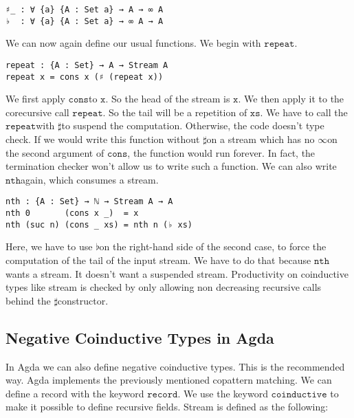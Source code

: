 \documentclass[a4paper,cleardoubleempty,BCOR1cm]{scrbook}
\begin{document}
\begin{verbatim}
♯_ : ∀ {a} {A : Set a} → A → ∞ A
♭  : ∀ {a} {A : Set a} → ∞ A → A
\end{verbatim}

We can now again define our usual functions.  We begin with $\mathtt{repeat}$.

\begin{verbatim}
repeat : {A : Set} → A → Stream A
repeat x = cons x (♯ (repeat x))
\end{verbatim}

We first apply $\mathtt{cons}$\;to $\mathtt{x}$. So the head of the stream is $\mathtt{x}$. We then apply
it to the corecursive call $\mathtt{repeat}$. So the tail will be a repetition of
$\mathtt{xs}$. We have to call the $\mathtt{repeat}$\;with $\mathtt{\sharp}$\;to suspend the computation.
Otherwise, the code doesn't type check. If we would write this function
without $\mathtt{\sharp}$\;on a stream which has no $\mathtt{\infty}$\;on the second argument of
$\mathtt{cons}$, the function would run forever. In fact, the termination checker won't
allow us to write such a function. We can also write $\mathtt{nth}$\;again, which
consumes a stream.

\begin{verbatim}
nth : {A : Set} → ℕ → Stream A → A
nth 0       (cons x _)  = x
nth (suc n) (cons _ xs) = nth n (♭ xs)
\end{verbatim}

Here, we have to use $\mathtt{\flat}$\;on the right-hand side of the second case, to
force the computation of the tail of the input stream.  We have to do that
because $\mathtt{nth}$\;wants a stream.  It doesn't want a suspended stream.
Productivity on coinductive types like stream is checked by only allowing non
decreasing recursive calls behind the $\mathtt{\sharp}$\;constructor.

\subsection{Negative Coinductive Types in Agda}
\label{sec:orgda75ba9}
In Agda we can also define negative coinductive types.  This is the
recommended way.  Agda implements the previously mentioned copattern matching.
We can define a record with the keyword $\mathtt{record}$.  We use the keyword $\mathtt{coinductive}$
to make it possible to define recursive fields.  Stream is defined as the
following:
\end{document}
